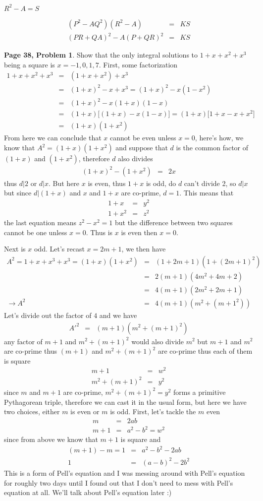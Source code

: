 \documentclass[aps,preprint,preprintnumbers,nofootinbib,showpacs,prd]{revtex4-1}
\newcommand{\nbea}{\begin{eqnarray*}}
\newcommand{\neea}{\end{eqnarray*}}
\begin{document}
$R^2 - A = S$

%
\nbea
(P^2 - AQ^2)(R^2 - A) & = & KS \\
(PR + QA)^2 - A(P + QR)^2 & = & KS
\neea
%













{\bf Page 38, Problem 1}. Show that the only integral solutions to $1 + x + x^2 + x^3$ being a square is $x = -1,0,1,7$. First, some factorization
%
\nbea
1 + x + x^2 + x^3 & = & (1 + x + x^2) + x^3 \\
& = & (1 + x)^2 - x + x^3 = (1 + x)^2 - x(1-x^2) \\
& = & (1 + x)^2 - x(1+x)(1-x)\\
& = & (1 + x)\lbrack(1 + x) - x(1-x)\rbrack = (1 + x)\lbrack1 + x - x + x^2\rbrack \\
& = & (1+x)(1+x^2)
\neea
%
From here we can conclude that $x$ cannot be even unless $x=0$, here's how, we know that $A^2 = (1+x)(1+x^2)$ 
and suppose that $d$ is the common factor of $(1+x)$ and $(1+x^2)$, therefore $d$ also divides
%
\nbea
(1+x)^2 - (1+x^2) & = & 2x
\neea
% 
thus $d|2$ or $d|x$. But here $x$ is even, thus $1+x$ is odd, do $d$ can't divide 2, so $d|x$ but since $d|(1+x)$ and $x$ and $1+x$ are co-prime, $d=1$. This means that 
%
\nbea
1 + x & = & y^2 \\
1 + x^2 & = & z^2
\neea
%
the last equation means $z^2 - x^2 = 1$ but the difference between two squares cannot be one unless $x=0$. Thus is $x$ is even then $x = 0$.

Next is $x$ odd. Let's recast $x = 2m+1$, we then have
%
\nbea
A^2 = 1 + x + x^3 + x^3 = (1+x)(1+x^2) & = & (1 + 2m + 1)(1 + (2m + 1)^2) \\
& = & 2(m+1)(4m^2 + 4m + 2) \\
& = & 4(m+1)(2m^2 + 2m + 1) \\
\to A^2 & = & 4(m + 1)(m^2 + (m+1^2))
\neea
%
Let's divide out the factor of $4$ and we have
%
\nbea
A'^2 & = & (m + 1)(m^2 + (m+1)^2)
\neea
%
any factor of $m+1$ and $m^2 + (m+1)^2$ would also divide $m^2$ but $m+1$ and $m^2$ are co-prime thus $(m+1)$ and $m^2 + (m+1)^2$ are co-prime thus each of them is square
%
\nbea
m + 1 & = & w^2 \\
m^2 + (m+1)^2 & = & y^2
\neea
%
since $m$ and $m+1$ are co-prime, $m^2 + (m+1)^2 = y^2$ forms a primitive Pythagorean triple, therefore we can cast it in the usual form, but here we have two choices, either $m$ is even or $m$ is odd. First, let's tackle the $m$ even
%
\nbea
m & = & 2ab \\
m + 1 & = & a^2 - b^2 = w^2
\neea
%
since from above we know that $m+1$ is square and 
%
\nbea
(m + 1) - m = 1 & = & a^2 - b^2 - 2ab \\
1 & = & (a-b)^2 - 2b^2
\neea
%
This is a form of Pell's equation and I was messing around with Pell's equation for roughly two days until I found out that I don't need to mess with Pell's equation at all. We'll talk about Pell's equation later :)
\end{document}

